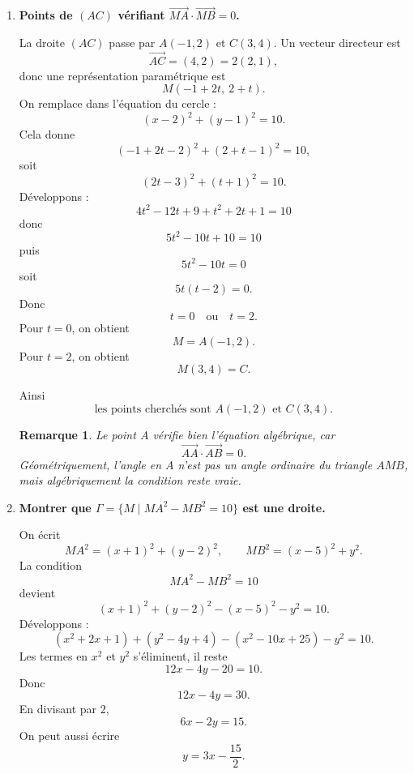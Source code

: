 \documentclass[11pt,a4paper]{article}
\newcommand{\vv}[1]{\overrightarrow{#1}}
\newtheorem*{remarque}{Remarque}
\begin{document}
\begin{enumerate}[label=\textbf{\arabic*.}]
    On retrouve donc le théorème classique :
    \[
    \boxed{\widehat{AMB}=90^\circ \iff M \text{ appartient au cercle de diamètre } [AB].}
    \]

    Vérifions la cohérence : le milieu de \([AB]\) est \((2,1)\), et
    \[
    AB=2\sqrt{10},
    \]
    donc le rayon du cercle de diamètre \([AB]\) est bien
    \[
    \frac{AB}{2}=\sqrt{10}.
    \]
    C'est exactement le cercle trouvé.

    \item \textbf{Points de \((AC)\) vérifiant \(\vv{MA}\cdot\vv{MB}=0\).}

    La droite \((AC)\) passe par \(A(-1,2)\) et \(C(3,4)\).  
    Un vecteur directeur est
    \[
    \vv{AC}=(4,2)=2(2,1),
    \]
    donc une représentation paramétrique est
    \[
    M(-1+2t,\ 2+t).
    \]
    On remplace dans l'équation du cercle :
    \[
    (x-2)^2+(y-1)^2=10.
    \]
    Cela donne
    \[
    (-1+2t-2)^2+(2+t-1)^2=10,
    \]
    soit
    \[
    (2t-3)^2+(t+1)^2=10.
    \]
    Développons :
    \[
    4t^2-12t+9+t^2+2t+1=10
    \]
    donc
    \[
    5t^2-10t+10=10
    \]
    puis
    \[
    5t^2-10t=0
    \]
    soit
    \[
    5t(t-2)=0.
    \]
    Donc
    \[
    t=0 \quad \text{ou}\quad t=2.
    \]
    Pour \(t=0\), on obtient
    \[
    M=A(-1,2).
    \]
    Pour \(t=2\), on obtient
    \[
    M(3,4)=C.
    \]

    Ainsi
    \[
    \boxed{\text{les points cherchés sont }A(-1,2)\text{ et }C(3,4).}
    \]

    \begin{remarque}
    Le point \(A\) vérifie bien l'équation algébrique, car
    \[
    \vv{AA}\cdot\vv{AB}=0.
    \]
    Géométriquement, l'angle en \(A\) n'est pas un angle ordinaire du triangle \(AMB\), mais algébriquement la condition reste vraie.
    \end{remarque}

    \item \textbf{Montrer que \(\Gamma=\{M\mid MA^2-MB^2=10\}\) est une droite.}

    On écrit
    \[
    MA^2=(x+1)^2+(y-2)^2,
    \qquad
    MB^2=(x-5)^2+y^2.
    \]
    La condition
    \[
    MA^2-MB^2=10
    \]
    devient
    \[
    (x+1)^2+(y-2)^2-(x-5)^2-y^2=10.
    \]
    Développons :
    \[
    (x^2+2x+1)+(y^2-4y+4)-(x^2-10x+25)-y^2=10.
    \]
    Les termes en \(x^2\) et \(y^2\) s'éliminent, il reste
    \[
    12x-4y-20=10.
    \]
    Donc
    \[
    12x-4y=30.
    \]
    En divisant par \(2\),
    \[
    6x-2y=15.
    \]
    On peut aussi écrire
    \[
    y=3x-\frac{15}{2}.
    \]


\end{enumerate}
\end{document}

